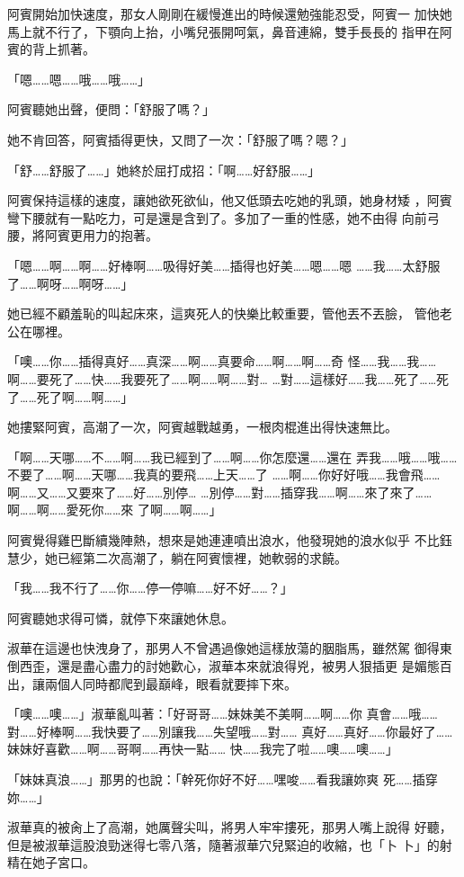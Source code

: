 阿賓開始加快速度，那女人剛剛在緩慢進出的時候還勉強能忍受，阿賓一
加快她馬上就不行了，下顎向上抬，小嘴兒張開呵氣，鼻音連綿，雙手長長的
指甲在阿賓的背上抓著。

「嗯……嗯……哦……哦……」

阿賓聽她出聲，便問：「舒服了嗎？」

她不肯回答，阿賓插得更快，又問了一次：「舒服了嗎？嗯？」

「舒……舒服了……」她終於屈打成招：「啊……好舒服……」

阿賓保持這樣的速度，讓她欲死欲仙，他又低頭去吃她的乳頭，她身材矮
，阿賓彎下腰就有一點吃力，可是還是含到了。多加了一重的性感，她不由得
向前弓腰，將阿賓更用力的抱著。

「嗯……啊……啊……好棒啊……吸得好美……插得也好美……嗯……嗯
……我……太舒服了……啊呀……啊呀……」

她已經不顧羞恥的叫起床來，這爽死人的快樂比較重要，管他丟不丟臉，
管他老公在哪裡。

「噢……你……插得真好……真深……啊……真要命……啊……啊……奇
怪……我……我……啊……要死了……快……我要死了……啊……啊……對…
…對……這樣好……我……死了……死了……死了啊……啊……」

她摟緊阿賓，高潮了一次，阿賓越戰越勇，一根肉棍進出得快速無比。

「啊……天哪……不……啊……我已經到了……啊……你怎麼還……還在
弄我……哦……哦……不要了……啊……天哪……我真的要飛……上天……了
……啊……你好好哦……我會飛……啊……又……又要來了……好……別停…
…別停……對……插穿我……啊……來了來了……啊……啊……愛死你……來
了啊……啊……」

阿賓覺得雞巴斷續幾陣熱，想來是她連連噴出浪水，他發現她的浪水似乎
不比鈺慧少，她已經第二次高潮了，躺在阿賓懷裡，她軟弱的求饒。

「我……我不行了……你……停一停嘛……好不好……？」

阿賓聽她求得可憐，就停下來讓她休息。

淑華在這邊也快洩身了，那男人不曾遇過像她這樣放蕩的胭脂馬，雖然駕
御得東倒西歪，還是盡心盡力的討她歡心，淑華本來就浪得兇，被男人狠插更
是媚態百出，讓兩個人同時都爬到最巔峰，眼看就要摔下來。

「噢……噢……」淑華亂叫著：「好哥哥……妹妹美不美啊……啊……你
真會……哦……對……好棒啊……我快要了……別讓我……失望哦……對……
真好……真好……你最好了……妹妹好喜歡……啊……哥啊……再快一點……
快……我完了啦……噢……噢……」

「妹妹真浪……」那男的也說：「幹死你好不好……嘿唆……看我讓妳爽
死……插穿妳……」

淑華真的被肏上了高潮，她厲聲尖叫，將男人牢牢摟死，那男人嘴上說得
好聽，但是被淑華這股浪勁迷得七零八落，隨著淑華穴兒緊迫的收縮，也「卜
卜」的射精在她子宮口。

